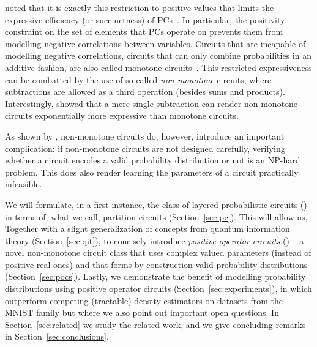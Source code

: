 \citet{zhang2020relationship} noted that it is exactly this restriction to positive values that limits the expressive efficiency (or succinctness) of PCs~\citep{martens2014expressive,decolnet2021compilation}. In particular, the positivity constraint on the set of elements that PCs operate on prevents them from modelling negative correlations between variables.
Circuits that are incapable of modelling negative correlations, \ie circuits that can only combine probabilities in an additive fashion, are also called monotone circuits~\citep{shpilka2010arithmetic}.
This restricted expressiveness can be combatted by the use of so-called \textit{non-monotone} circuits, where subtractions are allowed as a third operation (besides sums and products). Interestingly, \citet{valiant1979negation} showed that a mere single subtraction can render non-monotone circuits exponentially more expressive than monotone circuits.

As shown by \citet{harviainen2023inference}, non-monotone circuits do, however, introduce an important complication: if non-monotone circuits are not designed carefully, verifying whether a circuit encodes a valid probability distribution or not is an NP-hard problem. This does also render learning the parameters of a circuit practically infeasible.




We will formulate, in a first instance, the class of layered probabilistic circuits (\cf \citet{peharz2019random,peharz2020einsum}) in terms of, what we call, partition circuits (Section~\ref{sec:pc}).
This will allow us, Together with a slight generalization of concepts from quantum information theory (Section~\ref{sec:qit}),
to concisely introduce \textit{positive operator circuits} (\pocs) --
a novel non-monotone circuit class that uses complex valued parameters (instead of positive real ones) and that forms by construction valid probability distributions (Section~\ref{sec:pocs}).
Lastly, we demonstrate the benefit of modelling probability distributions using positive operator circuits (Section~\ref{sec:experiments}), in which \pocs outperform competing (tractable) density estimators on datasets from the MNIST family but where we also point out important open questions.
In Section~\ref{sec:related} we study the related work, and we give concluding remarks in Section~\ref{sec:conclusions}.





